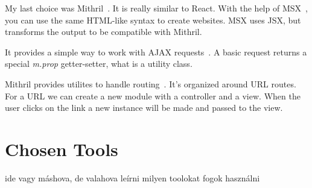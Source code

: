 My last choice was Mithril~\cite{Mithril}. It is really similar to React. With the help of MSX~\cite{MSX}, you can use the same HTML-like syntax to create websites. MSX uses JSX, but transforms the output to be compatible with Mithril. 

It provides a simple way to work with AJAX requests~\cite{Mithril-request}. A basic request returns a special \emph{m.prop} getter-setter, what is a utility class.

Mithril provides utilites to handle routing~\cite{Mithril-routing}. It's organized around URL routes. For a URL we can create a new module with a controller and a view. When the user clicks on the link a new instance will be made and passed to the view.

%
%

\section{Chosen Tools}
ide vagy máshova, de valahova leírni milyen toolokat fogok használni
